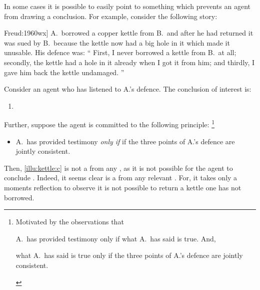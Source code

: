 \begin{note}
  In some cases it is possible to easily point to something which prevents an agent from drawing a conclusion.
  For example, consider the following story:

  \begin{scenario}[A copper kettle --- \cite[62]{Freud:1960wx}]%
    \label{illu:kettle}%
    A.\ borrowed a copper kettle from B.\ and after he had returned it was sued by B.\ because the kettle now had a big hole in it which made it unusable.
    His defence was:
    ``%
    First, I never borrowed a kettle from B.\ at all;
    secondly, the kettle had a hole in it already when I got it from him;
    and thirdly, I gave him back the kettle undamaged.%
    ''
  \end{scenario}

  \noindent%
  Consider an agent who has listened to A.'s defence.
  The conclusion of interest is:
  \begin{enumerate}[label=C\thescenarioCounter., ref=C\thescenarioCounter]
  \item
    \label{illu:kettle:c}
  \end{enumerate}
  Further, suppose the agent is committed to the following principle:%
  \footnote{
    Motivated by the observations that
    \begin{enumerate*}[label=(\alph*), ref=(\alph*)]
    \item A.\ has provided testimony only if what A.\ has said is true.
      And,
    \item what A.\ has said is true only if the three points of A.'s defence are jointly consistent.
    \end{enumerate*}
  }
  \begin{itemize}
  \item
    A.\ has provided testimony \emph{only if} if the three points of A.'s defence are jointly consistent.
  \end{itemize}
  Then, \ref{illu:kettle:c} is not a \fc{} from any \pool{}, as it is not possible for the agent to conclude .
  Indeed, it seems clear  is a \fc{} from any relevant \pool{}.
  For, it takes only a moments reflection to observe it is not possible to return a kettle one has not borrowed.
\end{note}


